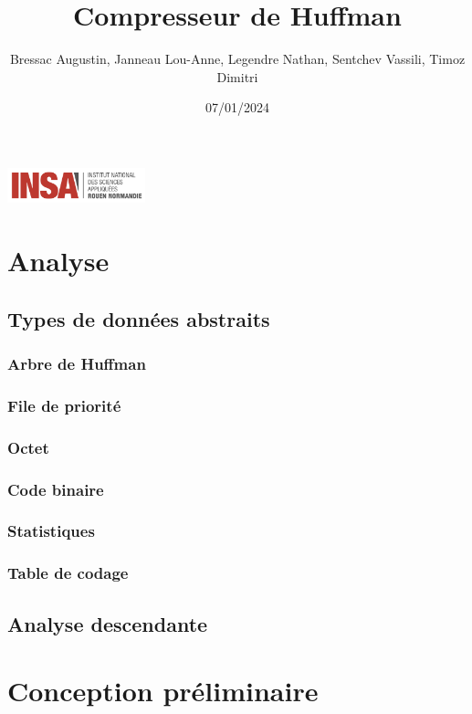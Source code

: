 \documentclass[12pt,a4paper]{article}
\title{Compresseur de Huffman}
\author{Bressac Augustin, Janneau Lou-Anne, Legendre Nathan, Sentchev Vassili, Timoz Dimitri}
\date{07/01/2024}
\begin{document}
\includegraphics[width=0.3\textwidth]{Logo_INSA_RN.jpg}
\maketitle
\newpage
\tableofcontents

\section{Analyse}
\subsection{Types de données abstraits}
\subsubsection{Arbre de Huffman}

\subsubsection{File de priorité}

\subsubsection{Octet}

\subsubsection{Code binaire}

\subsubsection{Statistiques}

\subsubsection{Table de codage}

\subsection{Analyse descendante}
%

\section{Conception préliminaire}
\end{document}
